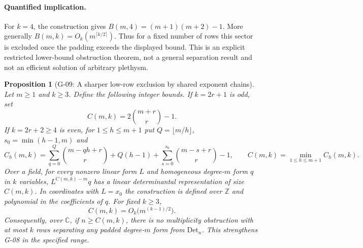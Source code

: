 \documentclass[11pt,a4paper]{article}
\newtheorem{proposition}{Proposition}
\theoremstyle{definition}\newtheorem{definition}{Definition}
\begin{document}
\paragraph{Quantified implication.}
For $k=4$, the construction gives $B(m,4)=(m+1)(m+2)-1$. More generally $B(m,k)=O_k(m^{\lceil k/2\rceil})$. Thus for a fixed number of rows this sector is excluded once the padding exceeds the displayed bound. This is an explicit restricted lower-bound obstruction theorem, not a general separation result and not an efficient solution of arbitrary plethysm.

\begin{proposition}[G-09: A sharper low-row exclusion by shared exponent chains]\label{G-09}
Let $m\geq1$ and $k\geq3$. Define the following integer bounds. If $k=2r+1$ is odd, set
\[
 C(m,k)=2\binom{m+r}{r}-1.
\]
If $k=2r+2\geq4$ is even, for $1\leq h\leq m+1$ put $Q=\lfloor m/h\rfloor$, $s_0=\min(h-1,m)$ and
\[
 C_h(m,k)=\sum_{q=0}^{Q}\binom{m-qh+r}{r}+Q(h-1)
          +\sum_{s=0}^{s_0}\binom{m-s+r}{r}-1,
 \qquad C(m,k)=\min_{1\leq h\leq m+1}C_h(m,k).
\]
Over a field, for every nonzero linear form $L$ and homogeneous degree-$m$ form $q$ in $k$ variables, $L^{C(m,k)-m}q$ has a linear determinantal representation of size $C(m,k)$. In coordinates with $L=x_0$ the construction is defined over $\mathbb Z$ and polynomial in the coefficients of $q$. For fixed $k\geq3$,
\[
 C(m,k)=O_k\bigl(m^{(k-1)/2}\bigr).
\]
Consequently, over $\mathbb C$, if $n\geq C(m,k)$, there is no multiplicity obstruction with at most $k$ rows separating any padded degree-$m$ form from $\mathrm{Det}_n$. This strengthens G-08 in the specified range.
\end{proposition}
\end{document}
